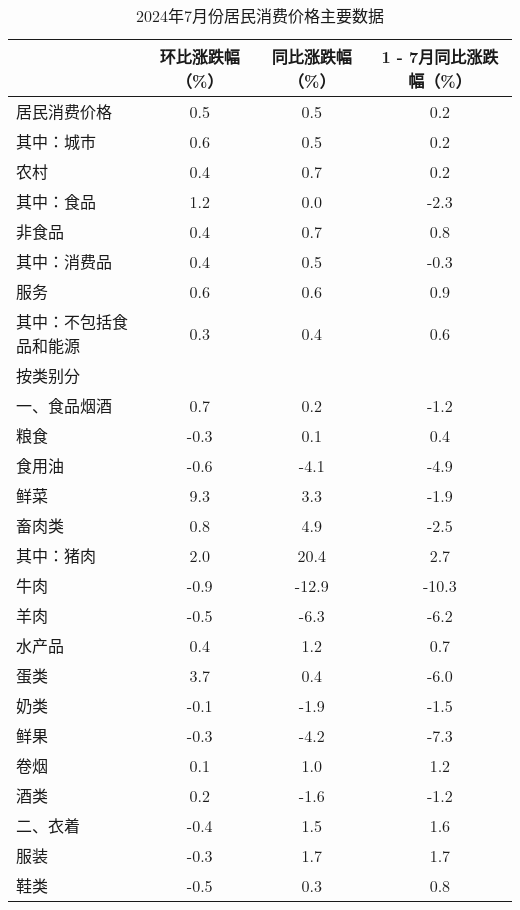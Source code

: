 \begin{table}[h]
    \centering
    \caption{2024年7月份居民消费价格主要数据}
    \footnotesize %
    \begin{tabular}{lccc}
        \toprule
        & 环比涨跌幅（\%） & 同比涨跌幅（\%） & 1 - 7月同比涨跌幅（\%） \\
        \midrule
        居民消费价格 & 0.5 & 0.5 & 0.2 \\[-3pt]
        其中：城市 & 0.6 & 0.5 & 0.2 \\[-3pt]
        农村 & 0.4 & 0.7 & 0.2 \\[-3pt]
        其中：食品 & 1.2 & 0.0 & -2.3 \\[-3pt]
        非食品 & 0.4 & 0.7 & 0.8 \\[-3pt]
        其中：消费品 & 0.4 & 0.5 & -0.3 \\[-3pt]
        服务 & 0.6 & 0.6 & 0.9 \\[-3pt]
        其中：不包括食品和能源 & 0.3 & 0.4 & 0.6 \\[-3pt]
        \midrule
        按类别分 & & & \\[-3pt]
        一、食品烟酒 & 0.7 & 0.2 & -1.2 \\[-3pt]
        粮食 & -0.3 & 0.1 & 0.4 \\[-3pt]
        食用油 & -0.6 & -4.1 & -4.9 \\[-3pt]
        鲜菜 & 9.3 & 3.3 & -1.9 \\[-3pt]
        畜肉类 & 0.8 & 4.9 & -2.5 \\[-3pt]
        其中：猪肉 & 2.0 & 20.4 & 2.7 \\[-3pt]
        牛肉 & -0.9 & -12.9 & -10.3 \\[-3pt]
        羊肉 & -0.5 & -6.3 & -6.2 \\[-3pt]
        水产品 & 0.4 & 1.2 & 0.7 \\[-3pt]
        蛋类 & 3.7 & 0.4 & -6.0 \\[-3pt]
        奶类 & -0.1 & -1.9 & -1.5 \\[-3pt]
        鲜果 & -0.3 & -4.2 & -7.3 \\[-3pt]
        卷烟 & 0.1 & 1.0 & 1.2 \\[-3pt]
        酒类 & 0.2 & -1.6 & -1.2 \\[-3pt]
        \midrule
        二、衣着 & -0.4 & 1.5 & 1.6 \\[-3pt]
        服装 & -0.3 & 1.7 & 1.7 \\[-3pt]
        鞋类 & -0.5 & 0.3 & 0.8 \\[-3pt]
        \midrule

\end{tabular}
\end{table}
